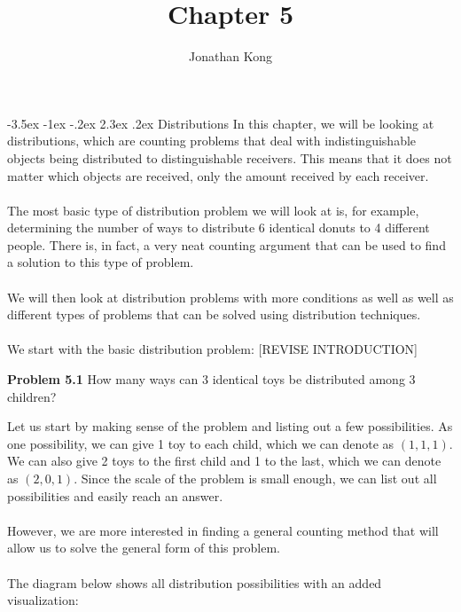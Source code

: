 \documentclass[11pt]{scrartcl}
\title{\normalfont\notesize\textbf{Chapter 5}}
\author{Jonathan Kong}
\date{}
\makeatletter
\renewcommand\section{\@startsection{section}{1}{\z@}%
                                   {-3.5ex \@plus -1ex \@minus -.2ex}%
                                   {2.3ex \@plus.2ex}%
                                   {\normalfont\large\bfseries}}
\makeatother
\begin{document}
\maketitle
\section{Distributions}
\noindent 
In this chapter, we will be looking at distributions, which are counting problems that deal with indistinguishable objects being distributed to distinguishable receivers. This means that it does not matter which objects are received, only the amount received by each receiver. \\
\\
\noindent 
The most basic type of distribution problem we will look at is, for example, determining the number of ways to distribute 6 identical donuts to 4 different people. There is, in fact, a very neat counting argument that can be used to find a solution to this type of problem.\\
\\
\noindent 
We will then look at distribution problems with more conditions as well as well as different types of problems that can be solved using distribution techniques. \\
\\
\noindent 
We start with the basic distribution problem: [REVISE INTRODUCTION] 
\\
\begin{tcolorbox}
\textbf{Problem 5.1} How many ways can 3 identical toys be distributed among 3 children?
\end{tcolorbox}
\noindent 
Let us start by making sense of the problem and listing out a few possibilities. As one possibility, we can give 1 toy to each child, which we can denote as $(1,1,1)$. We can also give 2 toys to the first child and 1 to the last, which we can denote as $(2,0,1)$. Since the scale of the problem is small enough, we can list out all possibilities and easily reach an answer. \\
\\
\noindent 
However, we are more interested in finding a general counting method that will allow us to solve the general form of this problem. \\
\\
\noindent 
The diagram below shows all distribution possibilities with an added visualization:
\begin{center}
\end{center}\\
\end{document}
